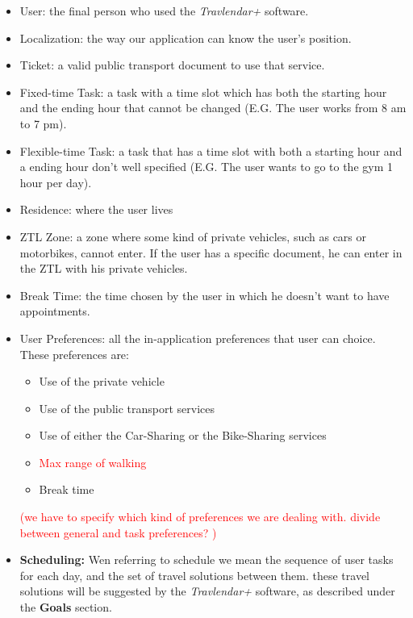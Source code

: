 \begin{itemize}
    \item User: the final person who used the \emph{Travlendar+} software.
    
    \item Localization: the way our application can know the user's position.
    
    \item Ticket: a valid public transport document to use that service.
    
    \item Fixed-time Task: a task with a time slot which has both the starting hour and the ending hour that cannot be changed (E.G. The user works from 8 am to 7 pm).
    
    \item Flexible-time Task: a task that has a time slot with both a starting hour and a ending hour don't well specified (E.G. The user wants to go to the gym 1 hour per day).
        
    \item Residence: where the user lives
    
    \item ZTL Zone: a zone where some kind of private vehicles, such as cars or motorbikes, cannot enter. If the user has a specific document, he can enter in the ZTL with his private vehicles.
    
    \item Break Time: the time chosen by the user in which he doesn't want to have appointments.
    
    
    \item User Preferences: all the in-application preferences that user can choice. These preferences are: 
    \begin{itemize}
        \item Use of the private vehicle
        \item Use of the public transport services
        \item Use of either the Car-Sharing or the Bike-Sharing services
        \item \textcolor{red}{Max range of walking}
    	\item Break time
    \end{itemize}
    \textcolor{red}{(we have to specify which kind of preferences we are dealing with. divide between general and task preferences? )}
    
    \item \textbf{Scheduling:} Wen referring to schedule we mean the sequence of user tasks for each day, and the set of travel solutions between them. these travel solutions will be suggested by the \emph{Travlendar+} software, as described under the \textbf{Goals} section. 
    

\end{itemize}
